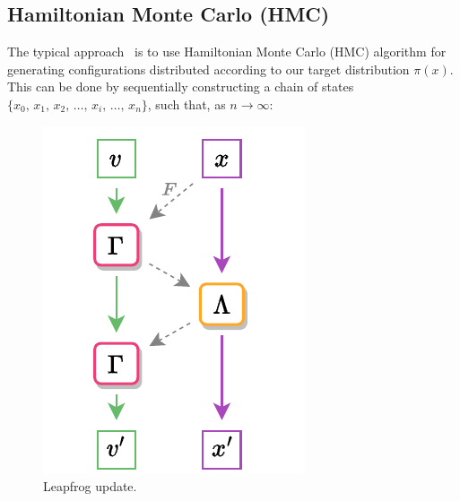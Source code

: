 \documentclass[a4paper,11pt]{article}
\begin{document}
\subsection{Hamiltonian Monte Carlo (HMC)}
\label{subsec:hmc}
%
The typical approach~\cite{foreman_deep_2021,foreman_leapfroglayers_2022} is to use 
%
Hamiltonian Monte Carlo (HMC) algorithm for generating configurations 
%
distributed according to our target distribution $\pi(x)$.
%
This can be done by sequentially constructing a chain of states $\{x_{0},\, x_{1},\, x_{2},\, \ldots,\, x_{i},\, \ldots,\, x_{n}\}$, such that, as $n \rightarrow \infty$:
%
%
\begin{figure}
  \begin{center}
  \caption{\label{fig:hmc-update}Leapfrog update.}
  \includegraphics[width=\linewidth]{assets/hmc-update.pdf}
  \end{center}
\end{figure}
\end{document}
